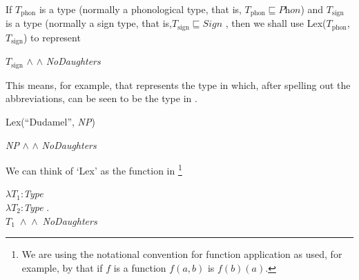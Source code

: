 If $T_{\mathrm{phon}}$ is a type (normally a phonological type, that is,
$T_{\mathrm{phon}}\sqsubseteq\textit{Phon}$) and $T_{\mathrm{sign}}$
is a type (normally a sign type, that is,$T_{\mathrm{sign}}\sqsubseteq\textit{Sign}$  , then we shall use
Lex($T_{\mathrm{phon}}$, $T_{\mathrm{sign}}$) to represent \nexteg{}
\begin{ex} 
$T_{\mathrm{sign}}$ \d{$\wedge$}
      \d{$\wedge$} \textit{NoDaughters} 
\end{ex} 
This means, for
example, that  represents the type in 
which, after spelling out the abbreviations, can be seen to be the
type in .
\begin{ex} 
\begin{subex}

\item  Lex(``Dudamel'', \textit{NP})
 
\item \textit{NP} \d{$\wedge$}
      \d{$\wedge$} \textit{NoDaughters} 
 
\item {} 
 
\end{subex} 
\label{ex:DudamelLex}   
\end{ex} 
We can think of `Lex' as the function in \nexteg{}\footnote{We are
  using the notational convention for function application as used,
  for example, by
  \cite{Montague1973} that if $f$ is a function $f(a,b)$ is $f(b)(a)$.}
\begin{ex} 
$\lambda T_1$:\textit{Type}\\
\hspace*{.25em}$\lambda T_2$:\textit{Type} . \\
\hspace*{.5em}\mbox{$T_1$ \d{$\wedge$}
      \d{$\wedge$} \textit{NoDaughters}}
\end{ex} 
